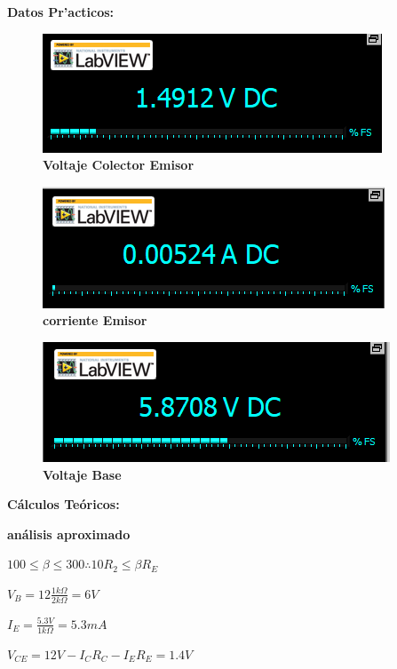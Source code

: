 \documentclass[11pt, letterpaper]{report}
\newcommand{\Center}[1]{
	\begin{center}
		#1
	\end{center}
} %
\newcommand{\Page}[3][c]{
	\begin{minipage}[#1]{#2\textwidth}
		#3
	\end{minipage}
}
\newenvironment{block}[1]{\hspace{-0.8 cm}\textbf{\Large #1}}{\vspace{3 mm}} %
\begin{document}
	\begin{block}{Datos Pr'acticos:}
		
		\vspace*{.5cm}
		\Page{.5}{
			\begin{figure}[H]
				\Center{
					\includegraphics[scale=.5]{Vce.png}
					\caption{\textbf{Voltaje Colector Emisor}}
				}
			\end{figure}
		}
		\Page{.5}{
			\begin{figure}[H]
				\Center{
					\includegraphics[scale=.5]{Ie.png}
					\caption{\textbf{corriente Emisor}}
				}
			\end{figure}
		}
	
		\begin{figure}[H]
			\Center{
				\includegraphics[scale=.4]{Vb.PNG}
				\caption{\textbf{Voltaje Base}}
			}
		\end{figure}
	
	\end{block}
	
	\begin{block}{C\'alculos Te\'oricos:\\}
		
		\textbf{an\'alisis aproximado}\\
		\Page{.33}{$100\leq\beta\leq300\therefore 10R_2 \leq\beta R_E$}
		\Page{.2}{$V_B=12\frac{1k\Omega}{2k\Omega}=6V$}
		\Page{.2}{$I_E=\frac{5.3V}{1k\Omega}=5.3mA$}
		
		\hspace*{-.5cm}$V_{CE}=12V-I_CR_C-I_ER_E=1.4V$
		
	\end{block}
			
\end{document}
